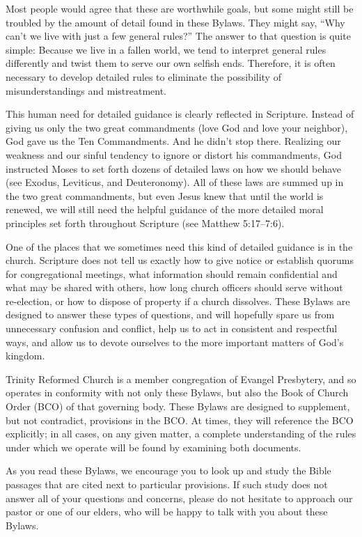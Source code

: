 \documentclass[
]{book}
\begin{document}
Most people would agree that these are worthwhile goals, but some might still be troubled by the amount of detail found in these Bylaws. They might say, ``Why can't we live with just a few general rules?'' The answer to that question is quite simple: Because we live in a fallen world, we tend to interpret general rules differently and twist them to serve our own selfish ends. Therefore, it is often necessary to develop detailed rules to eliminate the possibility of misunderstandings and mistreatment.

This human need for detailed guidance is clearly reflected in Scripture. Instead of giving us only the two great commandments (love God and love your neighbor), God gave us the Ten Commandments. And he didn't stop there. Realizing our weakness and our sinful tendency to ignore or distort his commandments, God instructed Moses to set forth dozens of detailed laws on how we should behave (see Exodus, Leviticus, and Deuteronomy). All of these laws are summed up in the two great commandments, but even Jesus knew that until the world is renewed, we will still need the helpful guidance of the more detailed moral principles set forth throughout Scripture (see Matthew 5:17--7:6).

One of the places that we sometimes need this kind of detailed guidance is in the church. Scripture does not tell us exactly how to give notice or establish quorums for congregational meetings, what information should remain confidential and what may be shared with others, how long church officers should serve without re-election, or how to dispose of property if a church dissolves. These Bylaws are designed to answer these types of questions, and will hopefully spare us from unnecessary confusion and conflict, help us to act in consistent and respectful ways, and allow us to devote ourselves to the more important matters of God's kingdom.

Trinity Reformed Church is a member congregation of Evangel Presbytery, and so operates in conformity with not only these Bylaws, but also the Book of Church Order (BCO) of that governing body. These Bylaws are designed to supplement, but not contradict, provisions in the BCO. At times, they will reference the BCO explicitly; in all cases, on any given matter, a complete understanding of the rules under which we operate will be found by examining both documents.

As you read these Bylaws, we encourage you to look up and study the Bible passages that are cited next to particular provisions. If such study does not answer all of your questions and concerns, please do not hesitate to approach our pastor or one of our elders, who will be happy to talk with you about these Bylaws.
\end{document}
